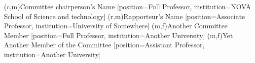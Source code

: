 %
%
%
%
%
%
(c,m){Committee chairperson's Name}
  [position=Full Professor, institution=NOVA School of Science and technology]
(r,m){Rapporteur's Name}
  [position=Associate Professor, institution=University of Somewhere]
(m,f){Another Committee Member}
  [position=Full Professor, institution=Another University]
(m,f){Yet Another Member of the Committee}
  [position=Assistant Professor, institution=Another University]



%
%
%
%
%
%
